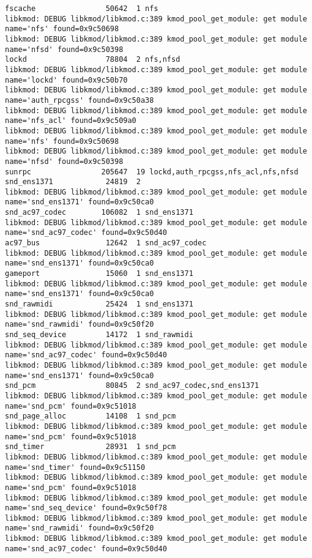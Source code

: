 \documentclass[11pt,a4paper]{article}
\begin{document}
{\begin{shaded}
\begin{verbatim}
fscache                50642  1 nfs
libkmod: DEBUG libkmod/libkmod.c:389 kmod_pool_get_module: get module name='nfs' found=0x9c50698
libkmod: DEBUG libkmod/libkmod.c:389 kmod_pool_get_module: get module name='nfsd' found=0x9c50398
lockd                  78804  2 nfs,nfsd
libkmod: DEBUG libkmod/libkmod.c:389 kmod_pool_get_module: get module name='lockd' found=0x9c50b70
libkmod: DEBUG libkmod/libkmod.c:389 kmod_pool_get_module: get module name='auth_rpcgss' found=0x9c50a38
libkmod: DEBUG libkmod/libkmod.c:389 kmod_pool_get_module: get module name='nfs_acl' found=0x9c509a0
libkmod: DEBUG libkmod/libkmod.c:389 kmod_pool_get_module: get module name='nfs' found=0x9c50698
libkmod: DEBUG libkmod/libkmod.c:389 kmod_pool_get_module: get module name='nfsd' found=0x9c50398
sunrpc                205647  19 lockd,auth_rpcgss,nfs_acl,nfs,nfsd
snd_ens1371            24819  2 
libkmod: DEBUG libkmod/libkmod.c:389 kmod_pool_get_module: get module name='snd_ens1371' found=0x9c50ca0
snd_ac97_codec        106082  1 snd_ens1371
libkmod: DEBUG libkmod/libkmod.c:389 kmod_pool_get_module: get module name='snd_ac97_codec' found=0x9c50d40
ac97_bus               12642  1 snd_ac97_codec
libkmod: DEBUG libkmod/libkmod.c:389 kmod_pool_get_module: get module name='snd_ens1371' found=0x9c50ca0
gameport               15060  1 snd_ens1371
libkmod: DEBUG libkmod/libkmod.c:389 kmod_pool_get_module: get module name='snd_ens1371' found=0x9c50ca0
snd_rawmidi            25424  1 snd_ens1371
libkmod: DEBUG libkmod/libkmod.c:389 kmod_pool_get_module: get module name='snd_rawmidi' found=0x9c50f20
snd_seq_device         14172  1 snd_rawmidi
libkmod: DEBUG libkmod/libkmod.c:389 kmod_pool_get_module: get module name='snd_ac97_codec' found=0x9c50d40
libkmod: DEBUG libkmod/libkmod.c:389 kmod_pool_get_module: get module name='snd_ens1371' found=0x9c50ca0
snd_pcm                80845  2 snd_ac97_codec,snd_ens1371
libkmod: DEBUG libkmod/libkmod.c:389 kmod_pool_get_module: get module name='snd_pcm' found=0x9c51018
snd_page_alloc         14108  1 snd_pcm
libkmod: DEBUG libkmod/libkmod.c:389 kmod_pool_get_module: get module name='snd_pcm' found=0x9c51018
snd_timer              28931  1 snd_pcm
libkmod: DEBUG libkmod/libkmod.c:389 kmod_pool_get_module: get module name='snd_timer' found=0x9c51150
libkmod: DEBUG libkmod/libkmod.c:389 kmod_pool_get_module: get module name='snd_pcm' found=0x9c51018
libkmod: DEBUG libkmod/libkmod.c:389 kmod_pool_get_module: get module name='snd_seq_device' found=0x9c50f78
libkmod: DEBUG libkmod/libkmod.c:389 kmod_pool_get_module: get module name='snd_rawmidi' found=0x9c50f20
libkmod: DEBUG libkmod/libkmod.c:389 kmod_pool_get_module: get module name='snd_ac97_codec' found=0x9c50d40

\end{verbatim}
\end{shaded}}
\end{document}
